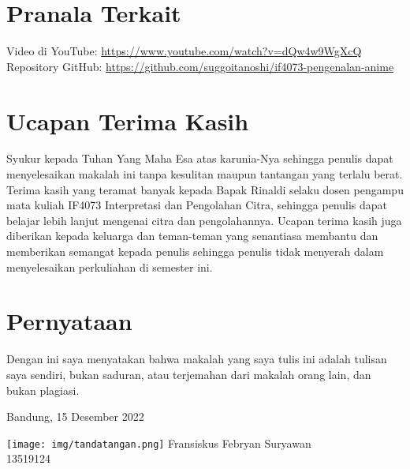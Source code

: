 \documentclass[conference, a4paper]{IEEEtran}
\begin{document}
\section*{Pranala Terkait}
Video di YouTube: \url{https://www.youtube.com/watch?v=dQw4w9WgXcQ}
Repository GitHub: \url{https://github.com/suggoitanoshi/if4073-pengenalan-anime}

\section*{Ucapan Terima Kasih}
Syukur kepada Tuhan Yang Maha Esa atas karunia-Nya sehingga penulis dapat menyelesaikan makalah ini tanpa kesulitan maupun tantangan yang terlalu berat. Terima kasih yang teramat banyak kepada Bapak Rinaldi selaku dosen pengampu mata kuliah IF4073 Interpretasi dan Pengolahan Citra, sehingga penulis dapat belajar lebih lanjut mengenai citra dan pengolahannya. Ucapan terima kasih juga diberikan kepada keluarga dan teman-teman yang senantiasa membantu dan memberikan semangat kepada penulis sehingga penulis tidak menyerah dalam menyelesaikan perkuliahan di semester ini.



\vspace{12pt}

\section*{Pernyataan}
\noindent
Dengan ini saya menyatakan bahwa makalah yang saya tulis ini adalah tulisan saya sendiri, bukan saduran, atau terjemahan dari makalah orang lain, dan bukan plagiasi.

  {
    \raggedleft

    Bandung, 15 Desember 2022

    \texttt{[image: img/tandatangan.png]}
    Fransiskus Febryan Suryawan\\
    13519124\\
  }
\end{document}
